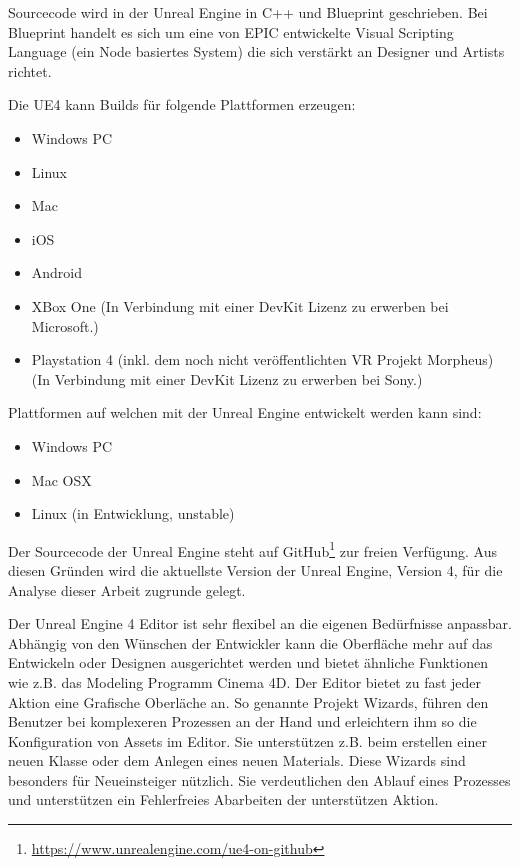 \documentclass[pagesize, paper=a4, fontsize=12pt, titlepage=true, headings=small, headnosepline, abstractoff, liststotoc, nochapterprefix, plainheadsepline, twoside]{scrreprt}
\begin{document}
Sourcecode wird in der Unreal Engine in C++ und Blueprint geschrieben. Bei Blueprint handelt es sich um eine von EPIC entwickelte Visual Scripting Language (ein Node basiertes System) die sich verstärkt an Designer und Artists richtet.

Die UE4 kann Builds für folgende Plattformen erzeugen:
\begin{itemize}
\item Windows PC
\item Linux
\item Mac
\item iOS
\item Android
\item XBox One (In Verbindung mit einer DevKit Lizenz zu erwerben bei Microsoft.)
\item Playstation 4 (inkl. dem noch nicht veröffentlichten VR Projekt Morpheus) (In Verbindung mit einer DevKit Lizenz zu erwerben bei Sony.)
\end{itemize}

Plattformen auf welchen mit der Unreal Engine entwickelt werden kann sind:
\begin{itemize}
\item Windows PC
\item Mac OSX
\item Linux (in Entwicklung, unstable)
\end{itemize}

Der Sourcecode der Unreal Engine steht auf GitHub\footnote{\url{https://www.unrealengine.com/ue4-on-github}} zur freien Verfügung. Aus diesen Gründen wird die aktuellste Version der Unreal Engine, Version 4, für die Analyse dieser Arbeit zugrunde gelegt.

Der Unreal Engine 4 Editor ist sehr flexibel an die eigenen Bedürfnisse anpassbar. Abhängig von den Wünschen der Entwickler kann die Oberfläche mehr auf das Entwickeln oder Designen ausgerichtet werden und bietet ähnliche Funktionen wie z.B. das Modeling Programm Cinema 4D. Der Editor bietet zu fast jeder Aktion eine Grafische Oberläche an. So genannte Projekt Wizards, führen den Benutzer bei komplexeren Prozessen an der Hand und erleichtern ihm so die Konfiguration von Assets im Editor. Sie unterstützen z.B. beim erstellen einer neuen Klasse oder dem Anlegen eines neuen Materials. Diese Wizards sind besonders für Neueinsteiger nützlich. Sie verdeutlichen den Ablauf eines Prozesses und unterstützen ein Fehlerfreies Abarbeiten der unterstützen Aktion.
\end{document}
